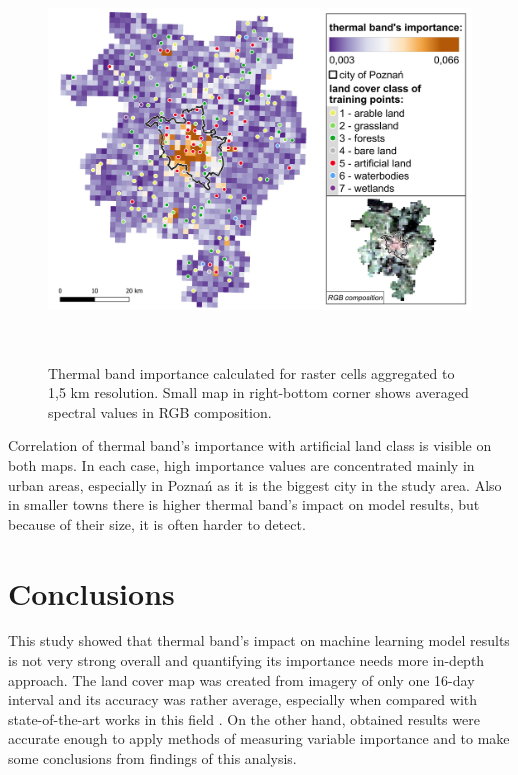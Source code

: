 \documentclass{amuthesis}
\begin{document}
\begin{figure}[H]

{\centering \includegraphics[width=5.875in,height=4.16667in]{./figures/B10_importance-spatial-ENG2.png}

}

\caption{\label{fig-rycina18}Thermal band importance calculated for
raster cells aggregated to 1,5 km resolution. Small map in right-bottom
corner shows averaged spectral values in RGB composition.}

\end{figure}

Correlation of thermal band's importance with artificial land class is
visible on both maps. In each case, high importance values are
concentrated mainly in urban areas, especially in Poznań as it is the
biggest city in the study area. Also in smaller towns there is higher
thermal band's impact on model results, but because of their size, it is
often harder to detect.


\hypertarget{conclusion}{%
\chapter{Conclusions}\label{conclusion}}

This study showed that thermal band's impact on machine learning model
results is not very strong overall and quantifying its importance needs
more in-depth approach. The land cover map was created from imagery of
only one 16-day interval and its accuracy was rather average, especially
when compared with state-of-the-art works in this field
\autocite{malinowski_automated_2020,witjes_spatiotemporal_2021}. On the
other hand, obtained results were accurate enough to apply methods of
measuring variable importance and to make some conclusions from findings
of this analysis.
\end{document}
